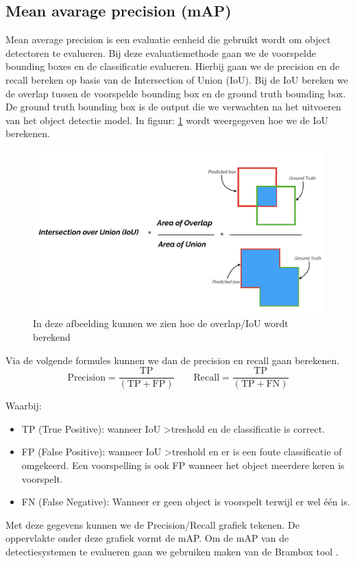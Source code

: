 \subsection{Mean avarage precision (mAP)} \label{map}
Mean average precision is een evaluatie eenheid die gebruikt wordt om object detectoren te evalueren.
Bij deze evaluatiemethode gaan we de voorspelde bounding boxes en de classificatie evalueren.
Hierbij gaan we de precision en de recall bereken op basis van de Intersection of Union (IoU).
Bij de IoU bereken we de overlap tussen de voorspelde bounding box en de ground truth bounding box.
De ground truth bounding box is de output die we verwachten na het uitvoeren van het object detectie model.
In figuur: \ref{fig:iou} wordt weergegeven hoe we de IoU berekenen.

\begin{figure}[!ht]
	\centering
	\includegraphics[width=0.80\linewidth]{fig/iou.png}
	\caption{In deze afbeelding kunnen we zien hoe de overlap/IoU wordt berekend}
	\label{fig:iou}
\end{figure}

Via de volgende formules kunnen we dan de precision en recall gaan berekenen.
\begin{equation}
	\textrm{Precision}  = \frac{\textrm{TP}}{(\textrm{TP} + \textrm{FP})} \qquad
	\textrm{Recall}  = \frac{\textrm{TP}}{(\textrm{TP} + \textrm{FN})}
\end{equation}

Waarbij:
\begin{itemize}
	\item TP (True Positive): wanneer IoU \textgreater treshold en de classificatie is correct.
	\item FP (False Positive): wanneer IoU \textgreater treshold en er is een foute classificatie of omgekeerd. Een voorspelling is ook FP wanneer het object meerdere keren is voorspelt.
	\item FN (False Negative): Wanneer er geen object is voorspelt terwijl er wel \'e\'en is.
\end{itemize}

Met deze gegevens kunnen we de Precision/Recall grafiek tekenen.
De oppervlakte onder deze grafiek vormt de mAP.
Om de mAP van de detectiesystemen te evalueren gaan we gebruiken maken van de Brambox tool \cite{eavise_eavise_2020}.
